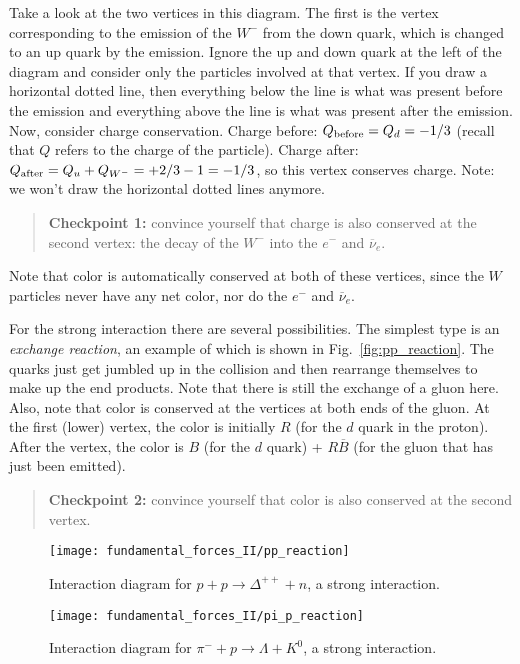Take a look at the two vertices in this diagram.  The first is the
vertex corresponding to the emission of the $W^-$ from the down quark,
which is changed to an up quark by the emission.  Ignore the up and
down quark at the left of the diagram and consider only the particles
involved at that vertex.  If you draw a horizontal dotted line, then
everything below the line is what was present before the emission and
everything above the line is what was present after the emission.
Now, consider charge conservation. Charge before: $Q_{\rm before} =
Q_d = -1/3$ (recall that $Q$ refers to the charge of the particle).
Charge after: $Q_{\rm after} = Q_u + Q_{W^-} = +2/3 - 1 = -1/3$, so
this vertex conserves charge.  Note: we won't draw the horizontal
dotted lines anymore.
\begin{quote}
{\bf Checkpoint 1:} convince yourself that charge is also conserved at
the second vertex: the decay of the $W^-$ into the $e^-$ and $\overline\nu_e$.
\end{quote}
Note that color is automatically conserved at both of these vertices,
since the $W$ particles never have any net color, nor do the $e^-$ and
$\overline\nu_e$.


For the strong interaction there are several possibilities.  The
simplest type is an {\em exchange reaction}, an example of which is
shown in Fig.~\ref{fig:pp_reaction}.  The quarks just get jumbled up
in the collision and then rearrange themselves to make up the end
products.  Note that there is still the exchange of a gluon here.
Also, note that color is conserved at the vertices at both ends of the
gluon.  At the first (lower) vertex, the color is initially $R$ (for
the $d$ quark in the proton).  After the vertex, the color is $B$ (for
the $d$ quark) + $R\overline B$ (for the gluon that has just been
emitted).
\begin{quote}
{\bf Checkpoint 2:} convince yourself that color is also conserved at
the second vertex.
\end{quote}

\begin{figure}[tbp]
\begin{minipage}[t]{5.5cm}
\begin{center}
\texttt{[image: fundamental\_forces\_II/pp\_reaction]}
\caption{Interaction diagram for $p + p \to \Delta^{++} + n$, a strong
  interaction.}
\label{fig:pp_reaction}
\end{center}
\end{minipage}
\hfill
\begin{minipage}[t]{5.5cm}
\begin{center}
\texttt{[image: fundamental\_forces\_II/pi\_p\_reaction]}
\caption{Interaction diagram for $\pi^- + p \to \Lambda + K^0$, a strong
  interaction.}
\label{fig:pi_p_reaction}
\end{center}
\end{minipage}
\end{figure}


